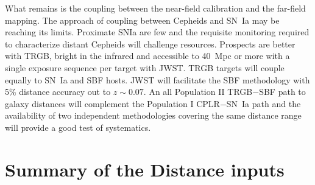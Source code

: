 \documentclass[twocolumn]{aastex63}
\begin{document}
What remains is the coupling between the near-field calibration and the far-field mapping. The approach of coupling between Cepheids and SN~Ia may be reaching its limits.  Proximate SNIa are few and the requisite monitoring required to characterize distant Cepheids will challenge resources.  Prospects are better with TRGB, bright in the infrared and accessible to 40~Mpc or more with a single exposure sequence per target with JWST.  TRGB targets will couple equally to SN~Ia and SBF hosts.  JWST will facilitate the SBF methodology with 5\% distance accuracy out to $z \sim 0.07$.  An all Population II TRGB$-$SBF path to galaxy distances will complement the Population I CPLR$-$SN~Ia path and the availability of two independent methodologies covering the same distance range will provide a good test of systematics.


\section{Summary of the Distance inputs}
\label{sec:summarytable}
\end{document}
